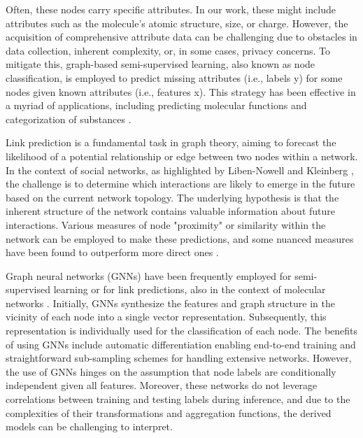 \documentclass[
11pt, %
oneside, %
english, %
singlespacing, %
headsepline, %
chapterinoneline, %
]{MastersDoctoralThesis} %
\begin{document}
Often, these nodes carry specific attributes. In our work, these might include attributes such as the molecule's atomic structure, size, or charge. However, the acquisition of comprehensive attribute data can be challenging due to obstacles in data collection, inherent complexity, or, in some cases, privacy concerns. To mitigate this, graph-based semi-supervised learning, also known as node classification, is employed to predict missing attributes (i.e., labels y) for some nodes given known attributes (i.e., features x). This strategy has been effective in a myriad of applications, including predicting molecular functions and categorization of substances \cite{NIPS2016_390e9825, liDeeperInsightsGraph2018}.

Link prediction is a fundamental task in graph theory, aiming to forecast the likelihood of a potential relationship or edge between two nodes within a network. In the context of social networks, as highlighted by Liben-Nowell and Kleinberg \cite{liben-nowellLinkPredictionProblem2003}, the challenge is to determine which interactions are likely to emerge in the future based on the current network topology. The underlying hypothesis is that the inherent structure of the network contains valuable information about future interactions. Various measures of node "proximity" or similarity within the network can be employed to make these predictions, and some nuanced measures have been found to outperform more direct ones \cite{zhangLinkPredictionBased2018}.

Graph neural networks (GNNs) \cite{wuGraphNeuralNetworks2022} have been frequently employed for semi-supervised learning or for link predictions, also in the context of molecular networks \cite{oyetundeBoostGAPFILLImprovingFidelity2017}. Initially, GNNs synthesize the features and graph structure in the vicinity of each node into a single vector representation. Subsequently, this representation is individually used for the classification of each node. The benefits of using GNNs include automatic differentiation enabling end-to-end training and straightforward sub-sampling schemes for handling extensive networks. However, the use of GNNs hinges on the assumption that node labels are conditionally independent given all features. Moreover, these networks do not leverage correlations between training and testing labels during inference, and due to the complexities of their transformations and aggregation functions, the derived models can be challenging to interpret.
\end{document}
